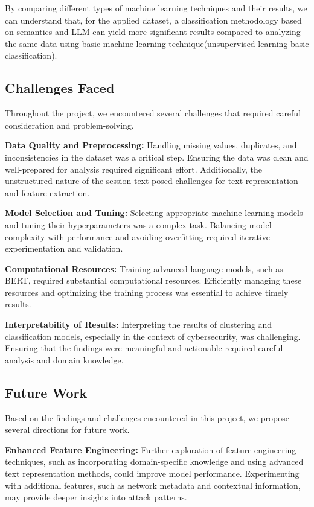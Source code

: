         \vspace{0.5em} By comparing different types of machine learning techniques and their results, we can understand that, for the applied dataset, a classification methodology based on semantics and LLM can yield more significant results compared to analyzing the same data using basic machine learning technique(unsupervised learning \/ basic classification).

    \subsection{Challenges Faced}
    
        Throughout the project, we encountered several challenges that required careful consideration and problem-solving.

        \textbf{Data Quality and Preprocessing:} Handling missing values, duplicates, and inconsistencies in the dataset was a critical step. Ensuring the data was clean and well-prepared for analysis required significant effort. Additionally, the unstructured nature of the session text posed challenges for text representation and feature extraction.

        \textbf{Model Selection and Tuning:} Selecting appropriate machine learning models and tuning their hyperparameters was a complex task. Balancing model complexity with performance and avoiding overfitting required iterative experimentation and validation.

        \textbf{Computational Resources:} Training advanced language models, such as BERT, required substantial computational resources. Efficiently managing these resources and optimizing the training process was essential to achieve timely results.

        \textbf{Interpretability of Results:} Interpreting the results of clustering and classification models, especially in the context of cybersecurity, was challenging. Ensuring that the findings were meaningful and actionable required careful analysis and domain knowledge.

    \subsection{Future Work}
    
        Based on the findings and challenges encountered in this project, we propose several directions for future work.

        \textbf{Enhanced Feature Engineering:} Further exploration of feature engineering techniques, such as incorporating domain-specific knowledge and using advanced text representation methods, could improve model performance. Experimenting with additional features, such as network metadata and contextual information, may provide deeper insights into attack patterns.


